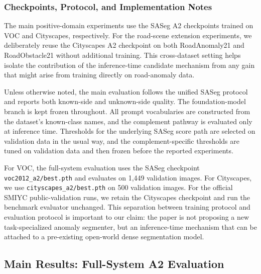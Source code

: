 \documentclass[a4paper,fleqn]{cas-dc}
\begin{document}
\subsubsection{Checkpoints, Protocol, and Implementation Notes}
\label{sec:exp:impl}

The main positive-domain experiments use the SASeg A2 checkpoints trained on VOC and Cityscapes, respectively. For the road-scene extension experiments, we deliberately reuse the Cityscapes A2 checkpoint on both RoadAnomaly21 and RoadObstacle21 without additional training. This cross-dataset setting helps isolate the contribution of the inference-time candidate mechanism from any gain that might arise from training directly on road-anomaly data.

Unless otherwise noted, the main evaluation follows the unified SASeg protocol and reports both known-side and unknown-side quality. The foundation-model branch is kept frozen throughout. All prompt vocabularies are constructed from the dataset's known-class names, and the complement pathway is evaluated only at inference time. Thresholds for the underlying SASeg score path are selected on validation data in the usual way, and the complement-specific thresholds are tuned on validation data and then frozen before the reported experiments.

For VOC, the full-system evaluation uses the SASeg checkpoint \texttt{voc2012\_a2/best.pth} and evaluates on 1,449 validation images. For Cityscapes, we use \texttt{cityscapes\_a2/best.pth} on 500 validation images. For the official SMIYC public-validation runs, we retain the Cityscapes checkpoint and run the benchmark evaluator unchanged. This separation between training protocol and evaluation protocol is important to our claim: the paper is not proposing a new task-specialized anomaly segmenter, but an inference-time mechanism that can be attached to a pre-existing open-world dense segmentation model.

\subsection{Main Results: Full-System A2 Evaluation}
\label{sec:exp:main}
\end{document}
